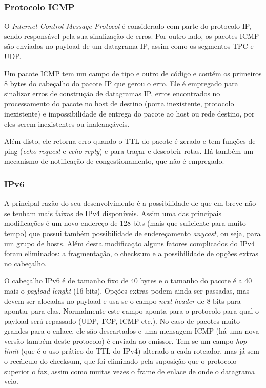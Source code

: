 \subsubsection{Protocolo ICMP}

O \emph{Internet Control Message Protocol} é considerado com parte do protocolo IP, sendo responsável pela sua sinalização de erros.
Por outro lado, os pacotes ICMP são enviados no payload de um datagrama IP, assim como os segmentos TPC e UDP.

Um pacote ICMP tem um campo de tipo e outro de código e contém os primeiros 8 bytes do cabeçalho do pacote IP que gerou o erro.
Ele é empregado para sinalizar erros de construção de datagramas IP, erros encontrados no processamento do pacote no host de destino
(porta inexistente, protocolo inexistente) e impossibilidade de entrega do pacote ao host ou rede destino, por eles serem inexistentes ou inalcançáveis.

Além disto, ele retorna erro quando o TTL do pacote é zerado e tem funções de ping (\emph{echo request} e \emph{echo reply}) e
para traçar e descobrir rotas.
Há também um mecanismo de notificação de congestionamento, que não é empregado.

\subsubsection{IPv6}

A principal razão do seu desenvolvimento é a possibilidade de que em breve não se tenham mais faixas de IPv4 disponíveis.
Assim uma das principais modificações é um novo endereço de 128 bits (mais que suficiente para muito tempo) que possui também possibilidade de endereçamento \emph{anycast}, ou seja, para um grupo de hosts.
Além desta modificação alguns fatores complicados do IPv4 foram eliminados: a fragmentação, o checksum e a possibilidade de opções extras no cabeçalho.

O cabeçalho IPv6 é de tamanho fixo de 40 bytes e o tamanho do pacote é a 40 mais o \emph{payload lenght} (16 bits).
Opções extras podem ainda ser passadas, mas devem ser alocadas no payload e usa-se o campo \emph{next header} de 8 bits para apontar para elas.
Normalmente este campo aponta para o protocolo para qual o payload será repassado (UDP, TCP, ICMP etc.).
No caso de pacotes muito grandes para o enlace, ele são descartados e uma mensagem ICMP (há uma nova versão também deste protocolo) é enviada ao emissor.
Tem-se um campo \emph{hop limit} (que é o uso prático do TTL do IPv4) alterado a cada roteador, mas já sem o recálculo do checksum, 
que foi eliminado pela suposição que o protocolo superior o faz, assim como muitas vezes o frame de enlace de onde o datagrama veio.

